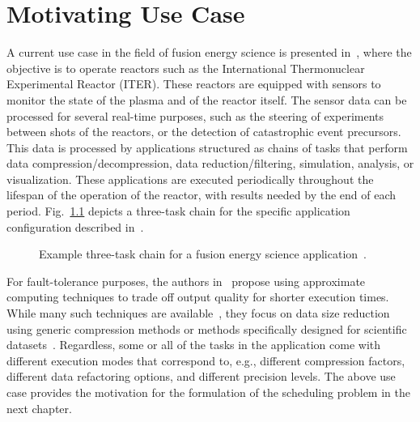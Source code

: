 \chapter{Motivating Use Case}
\label{sec:use-case}

A current use case in the field of fusion energy science is presented
in~\cite{10678736}, where the objective is to operate 
reactors such as the International Thermonuclear Experimental Reactor
(ITER). These reactors are equipped with sensors to monitor the state of
the plasma and of the reactor itself. The sensor data 
can be processed for several real-time purposes, such as the
steering of experiments between shots of the reactors, or
the detection of catastrophic event precursors.
This data is processed by applications structured as chains
of tasks that perform data compression/decompression, data
reduction/filtering, simulation, analysis, or visualization.  These
applications are executed periodically throughout the lifespan of the
operation of the reactor, with results needed by the end of each
period.  Fig.~\ref{fig:use_case} depicts a three-task chain for the
specific application configuration described in~\cite{9912722}.


\begin{figure}
\begin{center}
\scalebox{0.8}{
  
}
\end{center}
\caption{Example three-task chain for a fusion energy science application~\cite{9912722}.}
\label{fig:use_case}
\end{figure}

For fault-tolerance purposes, the authors in~\cite{10678736} propose using
approximate computing techniques to trade off output quality for
shorter execution times. While many such techniques are
available~\cite{10.1145/3716845, 10.1145/3711683}, they focus on data size
reduction using generic compression methods or methods specifically
designed for scientific datasets~\cite{10.1145/3733104}.  Regardless, some
or all of the tasks in the application come with different execution modes
that correspond to, e.g., different compression factors, different data
refactoring options, and different precision levels.  The above use case
provides the motivation for the formulation of the scheduling problem in
the next chapter.






